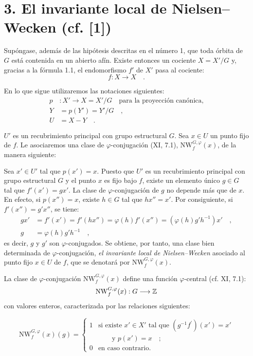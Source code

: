 \section*{3. El invariante local de Nielsen--Wecken (cf. [1])}
Supóngase, además de las hipótesis descritas en el número 1, que toda órbita de $G$ está contenida en un abierto afín. Existe entonces un cociente $X = X'/G$ y, gracias a la fórmula 1.1, el endomorfismo $f'$ de $X'$ pasa al cociente:
\[
f : X \longrightarrow X \quad .
\]

En lo que sigue utilizaremos las notaciones siguientes:
\begin{align*}
p &: X' \longrightarrow X = X'/G \quad \text{para la proyección canónica,} \\
Y &= p(Y') = Y'/G \quad , \\
U &= X - Y \quad .
\end{align*}

$U'$ es un recubrimiento principal con grupo estructural $G$. Sea $x \in U$ un punto fijo de $f$. Le asociaremos una clase de $\varphi$-conjugación (XI, 7.1), $\mathrm{NW}_{f}^{G,\varphi}(x)$, de la manera siguiente:

Sea $x' \in U'$ tal que $p(x') = x$. Puesto que $U'$ es un recubrimiento principal con grupo estructural $G$ y el punto $x$ es fijo bajo $f$, existe un elemento único $g \in G$ tal que $f'(x') = gx'$. La clase de $\varphi$-conjugación de $g$ no depende más que de $x$. En efecto, si $p(x'') = x$, existe $h \in G$ tal que $hx'' = x'$. Por consiguiente, si $f'(x'') = g'x''$, se tiene:
\begin{align*}
gx' &= f'(x') = f'(hx'') = \varphi(h)f'(x'') = (\varphi(h)g'h^{-1})x' \quad , \\
g &= \varphi(h)g'h^{-1} \quad ,
\end{align*}
es decir, $g$ y $g'$ son $\varphi$-conjugados. Se obtiene, por tanto, una clase bien determinada de $\varphi$-conjugación, \emph{el invariante local de Nielsen--Wecken} asociado al punto fijo $x \in U$ de $f$, que se denotará por $\mathrm{NW}_{f}^{G,\varphi}(x)$.

La clase de $\varphi$-conjugación $\mathrm{NW}_{f}^{G,\varphi}(x)$ define una función $\varphi$-central (cf. XI, 7.1):
\[
\mathrm{NW}_{f}^{G,\varphi}(x) : G \longrightarrow \mathbb Z
\]
con valores enteros, caracterizada por las relaciones siguientes:

\begin{equation}\tag{3.1}
\mathrm{NW}_{f}^{G,\varphi}(x)(g) = \begin{cases} 1 & \text{si existe } x' \in X' \text{ tal que } (g^{-1}f^{\prime})(x') = x' \\ & \qquad \text{y } p(x') = x \quad ; \\ 0 & \text{en caso contrario.} \end{cases}
\end{equation}
